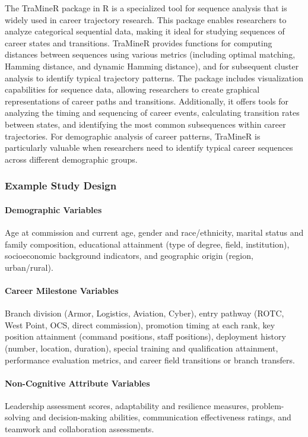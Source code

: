 \documentclass[../main.tex]{subfiles}
\begin{document}

The TraMineR package in R is a specialized tool for sequence analysis that is widely used in career trajectory research. This package enables researchers to analyze categorical sequential data, making it ideal for studying sequences of career states and transitions. TraMineR provides functions for computing distances between sequences using various metrics (including optimal matching, Hamming distance, and dynamic Hamming distance), and for subsequent cluster analysis to identify typical trajectory patterns. The package includes visualization capabilities for sequence data, allowing researchers to create graphical representations of career paths and transitions. Additionally, it offers tools for analyzing the timing and sequencing of career events, calculating transition rates between states, and identifying the most common subsequences within career trajectories. For demographic analysis of career patterns, TraMineR is particularly valuable when researchers need to identify typical career sequences across different demographic groups.

\subsubsection{Example Study Design}


\paragraph{Demographic Variables}
Age at commission and current age, gender and race/ethnicity, marital status and family composition, educational attainment (type of degree, field, institution), socioeconomic background indicators, and geographic origin (region, urban/rural).

\paragraph{Career Milestone Variables}
Branch division (Armor, Logistics, Aviation, Cyber), entry pathway (ROTC, West Point, OCS, direct commission), promotion timing at each rank, key position attainment (command positions, staff positions), deployment history (number, location, duration), special training and qualification attainment, performance evaluation metrics, and career field transitions or branch transfers.

\paragraph{Non-Cognitive Attribute Variables}
Leadership assessment scores, adaptability and resilience measures, problem-solving and decision-making abilities, communication effectiveness ratings, and teamwork and collaboration assessments.
\end{document}
